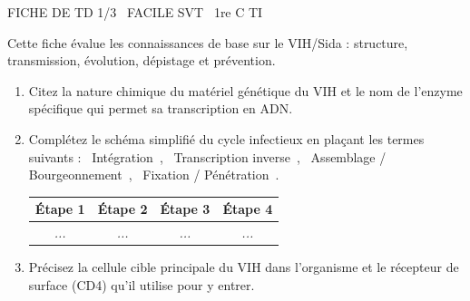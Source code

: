 \documentclass[11pt]{article}
\begin{document}
\begin{tcolorbox}[enhanced,colback=popink,colframe=popink,arc=10pt,boxrule=0pt,left=12pt,right=12pt,top=9pt,bottom=9pt]
{\color{white}\popxbold\small FICHE DE TD 1/3 \textbullet\ FACILE \hfill SVT \textbullet\ 1re C TI\par}
\end{tcolorbox}
\vspace{4pt}
Cette fiche évalue les connaissances de base sur le VIH/Sida : structure, transmission, évolution, dépistage et prévention.

\begin{exercice}
\begin{enumerate}
    \item Citez la nature chimique du matériel génétique du VIH et le nom de l'enzyme spécifique qui permet sa transcription en ADN.
    \item Complétez le schéma simplifié du cycle infectieux en plaçant les termes suivants : \og~Intégration~\fg{}, \og~Transcription inverse~\fg{}, \og~Assemblage / Bourgeonnement~\fg{}, \og~Fixation / Pénétration~\fg{}.
    \begin{center}
    \begin{tabular}{|c|c|c|c|}
    \hline
    \textbf{Étape 1} & \textbf{Étape 2} & \textbf{Étape 3} & \textbf{Étape 4} \\
    \hline
    \textit{...} & \textit{...} & \textit{...} & \textit{...} \\
    \hline
    \end{tabular}
    \end{center}
    \item Précisez la cellule cible principale du VIH dans l'organisme et le récepteur de surface (CD4) qu'il utilise pour y entrer.
\end{enumerate}
\end{exercice}
\end{document}
